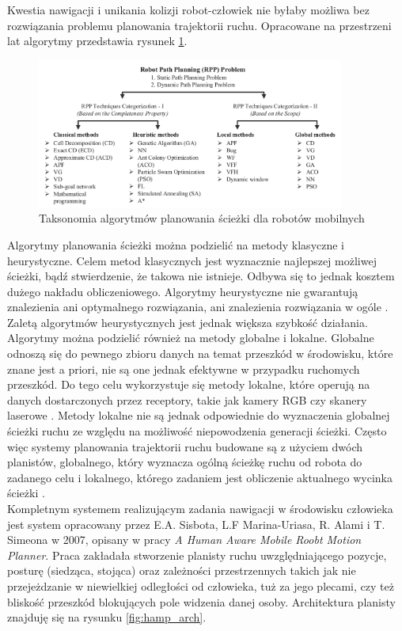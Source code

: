 Kwestia nawigacji i unikania kolizji robot-człowiek nie byłaby możliwa bez rozwiązania problemu planowania trajektorii ruchu. Opracowane na przestrzeni lat algorytmy przedstawia rysunek \ref{fig:taxonomy}.

\begin{figure}[H]
	\centering
	\includegraphics[width=0.9\textwidth]{gfx/taksonomia_planery.png}
	\caption{Taksonomia algorytmów planowania ścieżki dla robotów mobilnych\cite{taxonomy}}
	\label{fig:taxonomy}
\end{figure}

Algorytmy planowania ścieżki można podzielić na metody klasyczne i heurystyczne. Celem metod klasycznych jest wyznacznie najlepszej możliwej ścieżki, bądź stwierdzenie, że takowa nie istnieje. Odbywa się to jednak kosztem dużego nakładu obliczeniowego. Algorytmy heurystyczne nie gwarantują znalezienia ani optymalnego rozwiązania, ani znalezienia rozwiązania w ogóle \cite{planer_1}. Zaletą algorytmów heurystycznych jest jednak większa szybkość działania. Algorytmy można podzielić również na metody globalne i lokalne. Globalne odnoszą się do pewnego zbioru danych na temat przeszkód w środowisku, które znane jest a priori, nie są one jednak efektywne w przypadku ruchomych przeszkód. Do tego celu wykorzystuje się metody lokalne, które operują na danych dostarczonych przez receptory, takie jak kamery RGB czy skanery laserowe \cite{taxonomy}\cite{planer_1}\cite{planer_2}. Metody lokalne nie są jednak odpowiednie do wyznaczenia globalnej ścieżki ruchu ze względu na możliwość niepowodzenia generacji ścieżki. Często więc systemy planowania trajektorii ruchu budowane są z użyciem dwóch planistów, globalnego, który wyznacza ogólną ścieżkę ruchu od robota do zadanego celu i lokalnego, którego zadaniem jest obliczenie aktualnego wycinka ścieżki \cite{taxonomy}. \\

Kompletnym systemem realizującym zadania nawigacji w środowisku człowieka jest system opracowany przez E.A. Sisbota, L.F Marina-Uriasa, R. Alami i T. Simeona w 2007, opisany w pracy {\textit{A Human Aware Mobile Roobt Motion Planner}}\cite{ma}. Praca zakładała stworzenie planisty ruchu uwzględniającego pozycje, posturę (siedząca, stojąca) oraz zależności przestrzennych takich jak nie przejeżdzanie w niewielkiej odległości od człowieka, tuż za jego plecami, czy też bliskość przeszkód blokujących pole widzenia danej osoby. Architektura planisty znajduję się na rysunku \ref{fig:hamp_arch}.


